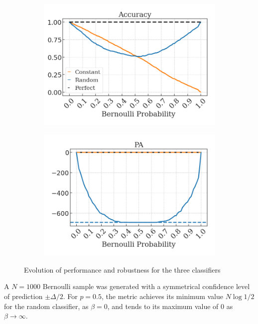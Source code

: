\begin{figure}[H]
    \centering
    \begin{subfigure}[b]{0.45\textwidth}
        \centering
        \includegraphics[width=\textwidth]{img/results_discussion/empirical/artificial_acc_final.png}
    \end{subfigure}
    \hfill
    \begin{subfigure}[b]{0.45\textwidth}
        \centering
        \includegraphics[width=\textwidth]{img/results_discussion/empirical/artificial_logPA_final.png}
    \end{subfigure}
    \caption{Evolution of performance and robustness for the three classifiers}
    \label{fig:empirical_plot}
\end{figure}

A $N=1000$ Bernoulli sample was generated with a symmetrical confidence level 
of prediction $\pm \Delta/2$. For $p=0.5$, the metric achieves its minimum 
value $N \log{1/2}$ for the random classifier, as $\beta = 0$, and tends to its maximum
value of $0$ as $\beta \longrightarrow \infty$.

